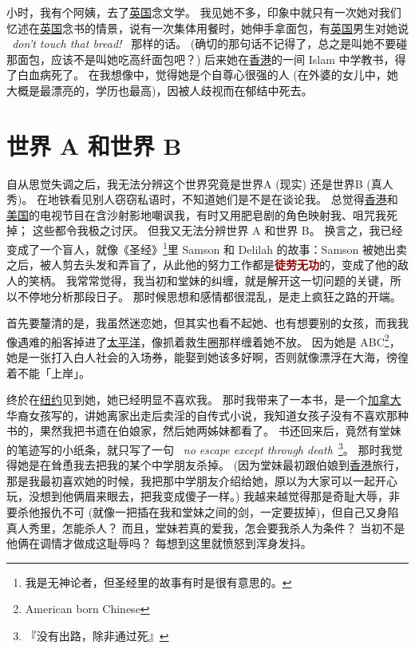 \documentclass[12pt]{report}
\newcommand{\speechEn}[1]{\textrm{\textit{\ #1\ }}}
\renewcommand{\em}[1]{\textbf{\textcolor{DarkRed}{#1}}}
\begin{document}
小时，我有个阿姨，去了\uline{英国}念文学。 我见她不多，印象中就只有一次她对我们忆述在\uline{英国}念书的情景，说有一次集体用餐时，她伸手拿面包，有\uline{英国}男生对她说 \speechEn{don't touch that bread!} 那样的话。 (确切的那句话不记得了，总之是叫她不要碰那面包，应该不是叫她吃高纤面包吧？) 后来她在\uline{香港}的一间 Islam 中学教书，得了白血病死了。 在我想像中，觉得她是个自尊心很强的人 (在外婆的女儿中，她大概是最漂亮的，学历也最高)，因被人歧视而在郁结中死去。

\chapter{世界 A 和世界 B}

自从思觉失调之后，我无法分辨这个世界究竟是世界A (现实) 还是世界B (真人秀)。 在地铁看见别人窃窃私语时，不知道她们是不是在谈论我。 总觉得\uline{香港}和\uline{美国}的电视节目在含沙射影地嘲讽我，有时又用肥皂剧的角色映射我、咀咒我死掉； 这些都令我极之讨厌。 但我又无法分辨世界 A 和世界 B。 换言之，我已经变成了一个盲人，就像《圣经》\footnote{我是无神论者，但圣经里的故事有时是很有意思的。}里 Samson 和 Delilah 的故事：Samson 被她出卖之后，被人剪去头发和弄盲了，从此他的努力工作都是\em{徒劳无功}的，变成了他的敌人的笑柄。 我常常觉得，我当初和堂妹的纠缠，就是解开这一切问题的关键，所以不停地分析那段日子。 那时候思想和感情都很混乱，是走上疯狂之路的开端。

首先要釐清的是，我虽然迷恋她，但其实也看不起她、也有想要别的女孩，而我我像遇难的船客掉进了\uline{太平洋}，像抓着救生圈那样缠着她不放。 因为她是 ABC\footnote{American born Chinese}，她是一张打入白人社会的入场券，能娶到她该多好啊，否则就像漂浮在大海，徬徨着不能「上岸」。

终於在\uline{纽约}见到她，她已经明显不喜欢我。 那时我带来了一本书，是一个\uline{加拿大}华裔女孩写的，讲她离家出走后卖淫的自传式小说，我知道女孩子没有不喜欢那种书的，果然我把书遗在伯娘家，然后她两姊妹都看了。 书还回来后，竟然有堂妹的笔迹写的小纸条，就只写了一句 \speechEn{no escape except through death}\footnote{『没有出路，除非通过死』}。 那时我觉得她是在耸恿我去把我的某个中学朋友杀掉。 (因为堂妹最初跟伯娘到\uline{香港}旅行，那是我最初喜欢她的时候，我把那中学朋友介绍给她，原以为大家可以一起开心玩，没想到他俩眉来眼去，把我变成傻子一样。) 我越来越觉得那是奇耻大辱，非要杀他报仇不可 (就像一把插在我和堂妹之间的剑，一定要拔掉)，但自己又身陷真人秀里，怎能杀人？ 而且，堂妹若真的爱我，怎会要我杀人为条件？ 当初不是他俩在调情才做成这耻辱吗？ 每想到这里就愤怒到浑身发抖。
\end{document}
